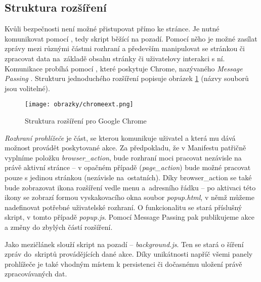 \subsection{Struktura rozšíření}
Kvůli bezpečnosti není možné přistupovat přímo ke stránce. Je nutné komunikovat pomocí , tedy skript běžící na pozadí. Pomocí něho je možné zasílat zprávy mezi různými částmi rozhraní a především manipulovat se stránkou či zpracovat data na~základě obsahu stránky či uživatelovy interakci s ní. Komunikace probíhá pomocí , které poskytuje Chrome, nazývaného \textit{Message Passing} \cite{chromemessaging}. Strukturu jednoduchého rozšíření popisuje obrázek \ref{obr1} (názvy souborů jsou volitelné).

\begin{figure}[h]
	\centering
	\texttt{[image: obrazky/chromeext.png]}
	\caption{Struktura rozšíření pro Google Chrome}
	\label{obr1}
\end{figure}

\textit{Rozhraní prohlížeče} je část, se kterou komunikuje uživatel a která mu dává možnost provádět poskytované akce. Za předpokladu, že v Manifestu patřičně vyplníme položku \textit{browser\_action}, bude rozhraní moci pracovat nezávisle na právě aktivní stránce -- v opačném případě (\textit{page\_action}) bude možné pracovat pouze s jedinou stránkou (nezávisle na~ostatních). Díky browser\_action se také bude zobrazovat ikona rozšíření vedle menu a~adresního řádku -- po aktivaci této ikony se zobrazí formou vyskakovacího okna soubor \textit{popup.html}, v němž můžeme nadefinovat potřebné uživatelské rozhraní. O funkcionalitu se stará příslušný skript, v tomto případě \textit{popup.js}. Pomocí Message Passing pak publikujeme akce a změny do zbylých částí rozšíření.

Jako mezičlánek slouží skript na pozadí -- \textit{background.js}. Ten se stará o šíření zpráv do~skriptů provádějících dané akce. Díky unikátnosti napříč všemi panely prohlížeče je také vhodným místem k persistenci či dočasnému uložení právě zpracovávaných dat.

